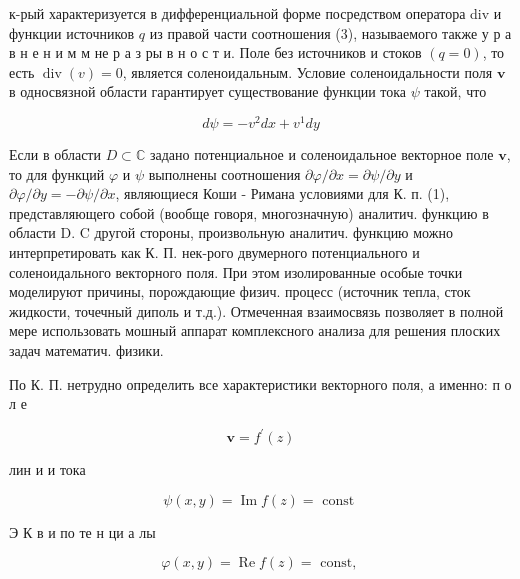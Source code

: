 \documentclass[10pt]{article}
\begin{document}
к-рый характеризуется в дифференциальной форме посредством оператора div и функции источников $q$ из правой части соотношения (3), называемого также у р а в н е н и м м не р а з ры в н о с т и. Поле без источников и стоков $(q=0)$, то есть $\operatorname{div}(v)=0$, является соленоидальным. Условие соленоидальности поля $\boldsymbol{v}$ в односвязной области гарантирует существование функции тока $\psi$ такой, что



\[

d \psi=-v^{2} d x+v^{1} d y

\]



Если в области $D \subset \mathbb{C}$ задано потенциальное и соленоидальное векторное поле $\boldsymbol{v}$, то для функций $\varphi$ и $\psi$ выполнены соотношения $\partial \varphi / \partial x=\partial \psi / \partial y$ и $\partial \varphi / \partial y=-\partial \psi / \partial x$, являющиеся Коши - Римана условиями для К. п. (1), представляющего собой (вообще говоря, многозначную) аналитич. функцию в области D. C другой стороны, произвольную аналитич. функцию можно интерпретировать как К. П. нек-рого двумерного потенциального и соленоидального векторного поля. При этом изолированные особые точки моделируют причины, порождающие физич. процесс (источник тепла, сток жидкости, точечный диполь и т.д.). Отмеченная взаимосвязь позволяет в полной мере использовать мошный аппарат комплексного анализа для решения плоских задач математич. физики.



По К. П. нетрудно определить все характеристики векторного поля, а именно: п о л е



\[

\boldsymbol{v}=f^{\prime}(z)

\]



лин и и тока



\[

\psi(x, y)=\operatorname{Im} f(z)=\text { const }

\]



Э К в и по те н ци а лы



\[

\varphi(x, y)=\operatorname{Re} f(z)=\text { const, }

\]
\end{document}
